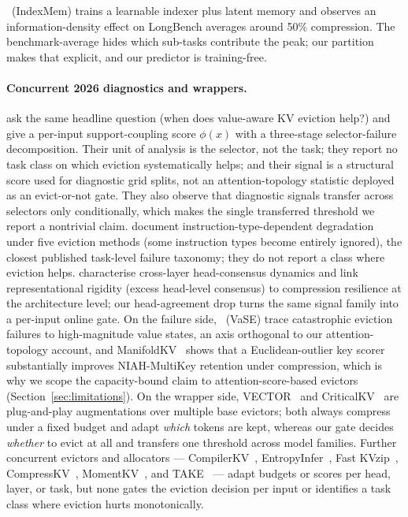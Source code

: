 \documentclass{article}
\begin{document}
\citet{arxiv260525475}~(IndexMem) trains a learnable indexer
plus latent memory and observes an information-density effect on LongBench
averages around 50\% compression. The benchmark-average hides which sub-tasks
contribute the peak; our partition makes that explicit, and our predictor is
training-free.

\paragraph{Concurrent 2026 diagnostics and wrappers.}
\citet{arxiv260508234} ask the same headline question (when does value-aware
KV eviction help?) and give a per-input support-coupling score $\phi(x)$ with
a three-stage selector-failure decomposition. Their unit of analysis is the
selector, not the task; they report no task class on which eviction
systematically helps; and their signal is a structural score used for
diagnostic grid splits, not an attention-topology statistic deployed as an
evict-or-not gate. They also observe that diagnostic signals transfer across
selectors only conditionally, which makes the single transferred threshold we
report a nontrivial claim. \citet{arxiv251000231} document
instruction-type-dependent degradation under five eviction methods (some
instruction types become entirely ignored), the closest published task-level
failure taxonomy; they do not report a class where eviction helps.
\citet{arxiv260301426} characterise cross-layer head-consensus dynamics and
link representational rigidity (excess head-level consensus) to compression
resilience at the architecture level; our head-agreement drop turns the same
signal family into a per-input online gate. On the failure side,
\citet{arxiv260603928}~(VaSE) trace catastrophic eviction failures to
high-magnitude value states, an axis orthogonal to our attention-topology
account, and ManifoldKV~\citep{arxiv260208343} shows that a Euclidean-outlier
key scorer substantially improves NIAH-MultiKey retention under compression,
which is why we scope the capacity-bound claim to attention-score-based
evictors (Section~\ref{sec:limitations}). On the wrapper side,
VECTOR~\citep{arxiv260523258} and CriticalKV~\citep{arxiv250203805} are
plug-and-play augmentations over multiple base evictors; both always compress
under a fixed budget and adapt \emph{which} tokens are kept, whereas our gate
decides \emph{whether} to evict at all and transfers one threshold across
model families. Further concurrent evictors and allocators ---
CompilerKV~\citep{arxiv260208686}, EntropyInfer~\citep{arxiv260609508},
Fast KVzip~\citep{arxiv260117668}, CompressKV~\citep{arxiv260624467},
MomentKV~\citep{arxiv260601563}, and TAKE~\citep{take-openreview} --- adapt
budgets or scores per head, layer, or task, but none gates the eviction
decision per input or identifies a task class where eviction hurts
monotonically.
\end{document}
